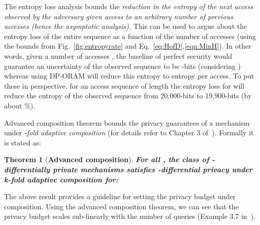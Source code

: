\documentclass[USenglish,oneside,twocolumn]{article}
\makeatletter
\newtheorem{theorem}{Theorem}
\let\origsection\section
\renewcommand\section{\@ifstar{\starsection}{\nostarsection}}
\newcommand\nostarsection[1]
{\sectionprelude\origsection{#1}\sectionpostlude}
\newcommand\starsection[1]
{\sectionprelude\origsection*{#1}\sectionpostlude}
\newcommand\sectionprelude{\vspace{-1em}
}
\newcommand\sectionpostlude{\vspace{-1em}
}
\makeatother
\begin{document}
The entropy loss analysis bounds the \textit{reduction in the entropy of the next access observed by the adversary given access to an arbitrary number of previous accesses (hence the asymptotic analysis).} This can be used to argue about the entropy loss of the entire sequence as a function of the number of accesses (using the bounds from Fig.~\ref{fig:entropyrate} and Eq.~\ref{eq:HofD},\ref{eqn:MinH}). In other words, given a number of accesses , the baseline of perfect security would guarantee an uncertainty of the observed sequence to be -bits (considering ) whereas using DP-ORAM will reduce this entropy to entropy per access. To put these in perspective, for an access sequence of length  the entropy loss for  will reduce the entropy of the observed sequence from 20,000-bits to 19,900-bits (by about \%).



\section{Advanced Composition theorem - DP}\label{appendix:advancedcomposition}
Advanced composition theorem bounds the privacy guarantees of a mechanism under \textit{-fold adaptive composition} (for details refer to Chapter 3 of~\cite{differentialprivacy}). Formally it is stated as: 

\begin{theorem}[\textbf{Advanced composition}]\label{thm:advancedcomposition}
\textbf{For all , the class of -differentially private mechanisms satisfies -differential privacy under k-fold adaptive composition for:
}
\end{theorem}

The above result provides a guideline for setting the privacy budget under composition. Using the advanced composition theorem, we can see that the privacy budget scales sub-linearly with the number of queries (Example 3.7 in~\cite{differentialprivacy}).



 
\end{document}
